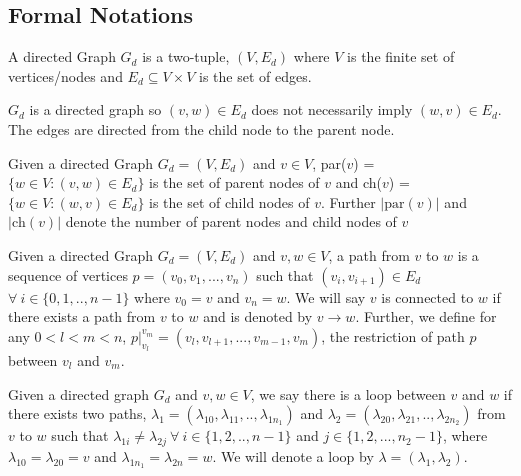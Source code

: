 \subsection{Formal Notations}
\begin{definition} \label{def:dgraphs} A directed Graph $G_d$ is a two-tuple, $(V,E_d)$ where $V$ is the finite set of vertices/nodes and $E_d \subseteq V \times V$ is the set of edges. 
\end{definition}
\begin{note}
$G_d$ is a directed graph so $(v,w) \in E_d$ does not necessarily imply $(w,v) \in E_d$. The edges are directed from the child node to the parent node.
\end{note}

\begin{definition}[Parents] Given a directed Graph $G_d = (V,E_d)$ and $v \in V$, par($v$) = $\{ w \in V : (v,w) \in E_d \}$ is the set of parent nodes of $v$ and ch($v$) = $\{ w \in V : (w,v) \in E_d \}$ is the set of child nodes of $v$. Further $|\text{par}(v)| $ and $|\text{ch}(v)|$ denote the number of parent nodes and child nodes of $v$
\end{definition}

\begin{definition}[Paths] Given a directed Graph $G_d = (V,E_d)$ and $v,w \in V$, a path from $v$ to $w$ is a sequence of vertices $p = (v_0,v_1,...,v_n)$ such that $(v_i,v_{i+1}) \in E_d$ $\forall \ i \in \{ 0,1,..,n-1 \} $ where $v_0= v $ and $v_n = w$. We will say $v$ is connected to $w$ if there exists a path from $v$ to $w$ and is denoted by $v \rightarrow w$. Further, we define for any $0 < l < m <n$, $p |_{v_l}^{v_m} = (v_l,v_{l+1},...,v_{m-1},v_m)$, the restriction of path $p$ between $v_l$ and $v_m$.


    
\end{definition}

\begin{definition}[Loops] Given a directed graph $G_d$ and $v,w \in V$, we say there is a loop between $v$ and $w$ if there exists two paths, $\lambda_1 = (\lambda_{10},\lambda_{11},..,\lambda_{1n_1})$ and $\lambda_2 = (\lambda_{20},\lambda_{21},..,\lambda_{2n_2})$ from $v$ to $w$ such that $\lambda_{1i} \neq \lambda_{2j} \ \forall \ i \in \{1,2,..,n-1\}$ and $j \in \{ 1,2,...,n_2-1\}$, where $\lambda_{10}=\lambda_{20}=v$ and $\lambda_{1n_1}=\lambda_{2n}=w$. We will denote a loop by $\lambda = (\lambda_1,\lambda_2)$.
\end{definition}

